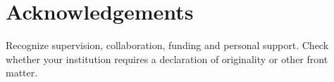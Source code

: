 \section*{Acknowledgements}
Recognize supervision, collaboration, funding and personal support. Check whether
your institution requires a declaration of originality or other front matter.
